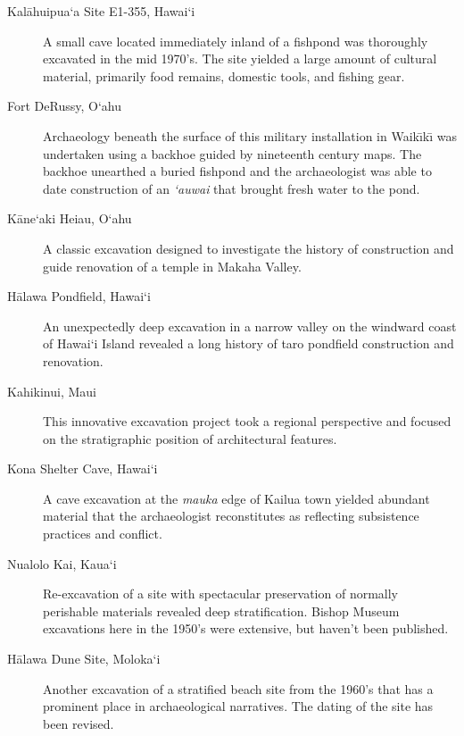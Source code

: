 \documentclass{scrartcl}
\begin{document}
\begin{description}
\item[{Kal\={a}huipua`a Site E1-355, Hawai`i}] A small cave located immediately inland of a
fishpond was thoroughly excavated in the mid 1970's.  The site yielded a
large amount of cultural material, primarily food remains, domestic
tools, and fishing gear.
\item[{Fort DeRussy, O`ahu}] Archaeology beneath the surface of this military
installation in  Waik\={\i}k\={\i} was undertaken using a backhoe guided by
nineteenth century maps.   The backhoe unearthed a buried fishpond and
the archaeologist was able to date construction of an \emph{`auwai} that
brought fresh water to the pond.
\end{description}

\begin{description}
\item[{K\={a}ne`aki Heiau, O`ahu}] A classic excavation designed to investigate the
history of construction and guide renovation of a temple in Makaha Valley.
\item[{H\={a}lawa Pondfield, Hawai`i}] An unexpectedly deep excavation in a narrow
valley on the windward coast of Hawai`i Island revealed a long history of
taro pondfield construction and renovation.
\end{description}

\begin{description}
\item[{Kahikinui, Maui}] This innovative excavation project took a regional
perspective and focused on the stratigraphic position of architectural
features.
\end{description}

\begin{description}
\item[{Kona Shelter Cave, Hawai`i}] A cave excavation at the \emph{mauka} edge of Kailua
town yielded abundant material that the archaeologist reconstitutes as
reflecting subsistence practices and conflict.
\item[{Nualolo Kai, Kaua`i}] Re-excavation of a site with spectacular preservation
of normally perishable materials revealed deep stratification. Bishop
Museum excavations here in the 1950's were extensive, but haven't been
published.
\end{description}

\begin{description}
\item[{H\={a}lawa Dune Site, Moloka`i}] Another excavation of a stratified beach site
from the 1960's that has a prominent place in archaeological narratives.
The dating of the site has been revised.
\end{description}
\end{document}
